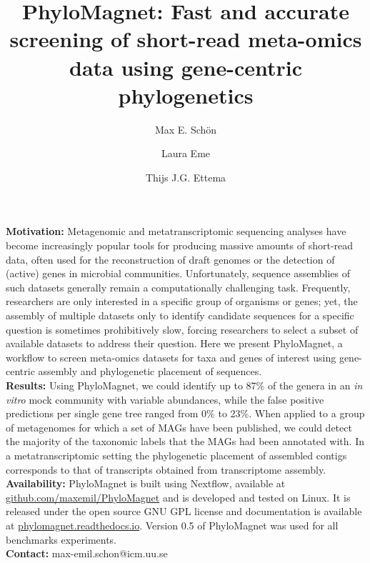 \documentclass[a4paper]{article}
\begin{document}
\title{PhyloMagnet: Fast and accurate screening of short-read meta-omics data using gene-centric phylogenetics}

\author[1]{Max E. Sch\"on}
\author[1]{Laura Eme}
\author[1,2]{Thijs J.G. Ettema}

\maketitle

\parindent 0pt \textbf{Motivation:} Metagenomic and metatranscriptomic sequencing analyses have become increasingly popular tools for  producing massive amounts of short-read data, often used for the reconstruction of draft genomes or the detection of (active) genes in microbial communities. Unfortunately, sequence assemblies of such datasets generally remain a computationally challenging task. Frequently, researchers are only interested in a specific group of organisms or genes; yet, the assembly of multiple datasets only to identify candidate sequences for a specific question is sometimes prohibitively slow, forcing researchers to select a subset of available datasets to address their question. Here we present PhyloMagnet, a workflow to screen meta-omics datasets for taxa and genes of interest using gene-centric assembly and phylogenetic placement of sequences.\\
\textbf{Results:} Using PhyloMagnet, we could identify up to 87\% of the genera in an \textit{in vitro} mock community with variable abundances, while the false positive predictions per single gene tree ranged from 0\% to 23\%. When applied to a group of metagenomes for which a set of MAGs have been published, we could detect the majority of the taxonomic labels that the MAGs had been annotated with. In a metatranscriptomic setting the phylogenetic placement of assembled contigs corresponds to that of transcripts obtained from transcriptome assembly.\\
\textbf{Availability:} PhyloMagnet is built using Nextflow, available at \href{https://github.com/maxemil/PhyloMagnet}{github.com/maxemil/PhyloMagnet} and is developed and tested on Linux. It is released under the open source GNU GPL license and documentation is available at \href{https://phylomagnet.readthedocs.io/en/latest/}{phylomagnet.readthedocs.io}. Version 0.5 of PhyloMagnet was used for all benchmarks experiments.\\
\textbf{Contact:} max-emil.schon@icm.uu.se\\
\end{document}
